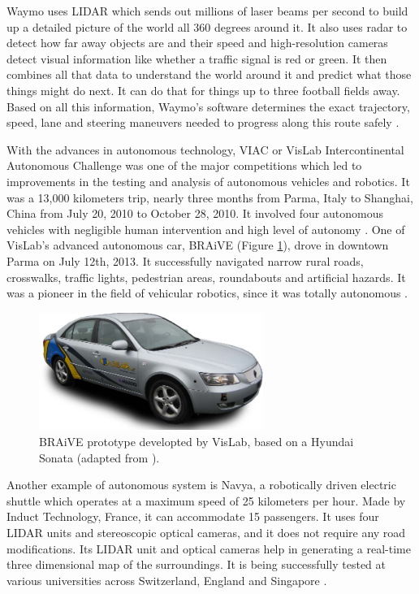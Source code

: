 Waymo uses LIDAR which sends out millions of laser beams per second to build up a detailed picture of the world all 360 degrees around it. It also uses radar to detect how far away objects are and their speed and high-resolution cameras detect visual information like whether a traffic signal is red or green. It then combines all that data to understand the world around it and predict what those things might do next. It can do that for things up to three football fields away. Based on all this information, Waymo's software determines the exact trajectory, speed, lane and steering maneuvers needed to progress along this route safely \cite{waymoh} \cite{waymot}.

With the advances in autonomous technology, VIAC or VisLab Intercontinental Autonomous Challenge was one of the major competitions which led to improvements in the testing and analysis of autonomous vehicles and robotics. It was a 13,000 kilometers trip, nearly three months from Parma, Italy to Shanghai, China from July 20, 2010 to October 28, 2010. It involved four autonomous vehicles with negligible human intervention and high level of autonomy \cite{Broggi2010}. One of VisLab's advanced autonomous car, BRAiVE (Figure \ref{fig:veiculos4}), drove in downtown Parma on July 12th, 2013. It successfully navigated narrow rural roads, crosswalks, traffic lights, pedestrian areas, roundabouts and artificial hazards. It was a pioneer in the field of vehicular robotics, since it was totally autonomous \cite{Broggi2013}.
\begin{figure}[!h]
	\centering
	\includegraphics[width=0.65\textwidth]{../figure/veiculos4.png}
	\caption{BRAiVE prototype developted by VisLab, based on a Hyundai Sonata (adapted from \cite{Broggi2013}).}
	\label{fig:veiculos4}
\end{figure}

Another example of autonomous system is Navya, a robotically driven electric shuttle which operates at a maximum speed of 25 kilometers per hour. Made by Induct Technology, France, it can accommodate 15 passengers. It uses four LIDAR units and stereoscopic optical cameras, and it does not
require any road modifications. Its LIDAR unit and
optical cameras help in generating a real-time three dimensional map of the surroundings. It is being successfully tested at various universities across Switzerland, England and Singapore \cite{Zhang2014}.

